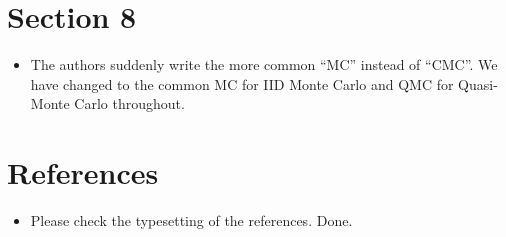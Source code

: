 \documentclass{article}[12pt]
\newcommand{\Referee}[1]{{\color{blue} #1 \newline}}
\begin{document}
\section*{Section 8}

\begin{itemize}
    \item \Referee{The authors suddenly write the more common ``MC'' instead of ``CMC''.}We have changed to the common MC for IID Monte Carlo and QMC for Quasi-Monte Carlo throughout. 
\end{itemize}

\section*{References}

\begin{itemize}
    \item \Referee{Please check the typesetting of the references.}Done. 
\end{itemize}
\end{document}
